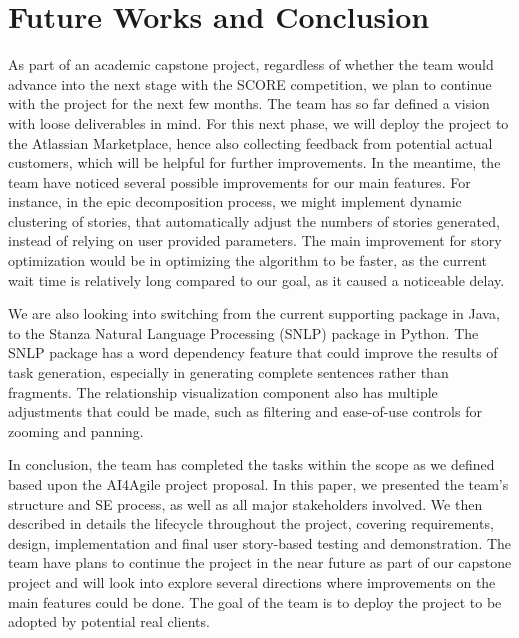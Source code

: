 \section{Future Works and Conclusion}
\label{conclusion}
As part of an academic capstone project, regardless of whether the team would advance into the next stage with the SCORE competition, we plan to continue with the project for the next few months. The team has so far defined a vision with loose deliverables in mind. For this next phase, we will deploy the project to the Atlassian Marketplace, hence also collecting feedback from potential actual customers, which will be helpful for further improvements.  In the meantime, the team have noticed several possible improvements for our main features. For instance, in the epic decomposition process, we might implement dynamic clustering of stories, that automatically adjust the numbers of stories generated, instead of relying on user provided parameters. The main improvement for story optimization would be in optimizing the algorithm to be faster, as the current wait time is relatively long compared to our goal, as it caused a noticeable delay. 

We are also looking into switching from the current supporting package in Java, to the Stanza Natural Language Processing (SNLP) \cite{NLP1} package in Python. The SNLP package has a word dependency feature that could improve the results of task generation, especially in generating complete sentences rather than fragments. The relationship visualization component also has multiple adjustments that could be made, such as filtering and ease-of-use controls for zooming and panning. 

In conclusion, the team has completed the tasks within the scope as we defined based upon the AI4Agile project proposal. In this paper, we presented the team's structure and SE process, as well as all major stakeholders involved. We then described in details the lifecycle throughout the project, covering requirements, design, implementation and final user story-based testing and demonstration. The team have plans to continue the project in the near future as part of our capstone project and will look into explore several directions where improvements on the main features could be done. The goal of the team is to deploy the project to be adopted by potential real clients. 